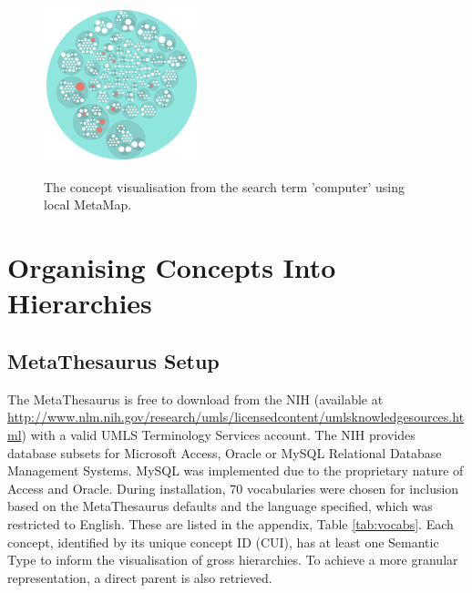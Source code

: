 \documentclass[Report.tex]{subfiles}
\begin{document}
\begin{figure}[ht!]
\begin{center}
\includegraphics[width=0.4\textwidth]{../lib/images/mm-screen.png}\\
\caption{The concept visualisation from the search term 'computer' using local MetaMap.}
\label{fig:mm-screen}
\end{center}
\end{figure}

\section{Organising Concepts Into Hierarchies}
\subsection{MetaThesaurus Setup}
The MetaThesaurus is free to download from the NIH (available at \url{http://www.nlm.nih.gov/research/umls/licensedcontent/umlsknowledgesources.html}) with a valid UMLS Terminology Services account. The NIH provides database subsets for Microsoft Access, Oracle or MySQL Relational Database Management Systems. MySQL was implemented due to the proprietary nature of Access and Oracle. During installation, 70 vocabularies were chosen for inclusion based on the MetaThesaurus defaults and the language specified, which was restricted to English. These are listed in the appendix, Table \ref{tab:vocabs}. Each concept, identified by its unique concept ID (CUI), has at least one Semantic Type to inform the visualisation of gross hierarchies. To achieve a more granular representation, a direct parent is also retrieved.\newpage
\end{document}
